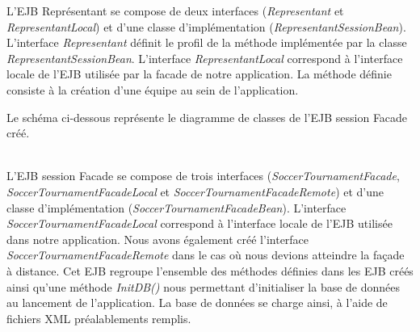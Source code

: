 \documentclass[10pt]{report}
\begin{document}
L'EJB Représentant se compose de deux interfaces (\textit{Representant} et \textit{RepresentantLocal}) et d'une classe d'implémentation (\textit{RepresentantSessionBean}). L'interface \textit{Representant} définit le profil de la méthode implémentée par la classe \textit{RepresentantSessionBean}. L'interface \textit{RepresentantLocal} correspond à l'interface locale de l'EJB utilisée par la facade de notre application. La méthode définie consiste à la création d'une équipe au sein de l'application.

\newpage
Le schéma ci-dessous représente le diagramme de classes de l'EJB session Facade créé. \\
	\begin{figure}[hp]
	      \begin{center}
	      \end{center}
	\end{figure}	
\\

L'EJB session Facade se compose de trois interfaces (\textit{SoccerTournamentFacade}, \textit{SoccerTournamentFacadeLocal} et \textit{SoccerTournamentFacadeRemote}) et d'une classe d'implémentation (\textit{SoccerTournamentFacadeBean}). L'interface \textit{SoccerTournamentFacadeLocal} correspond à l'interface locale de l'EJB utilisée dans notre application. Nous avons également créé l'interface \textit{SoccerTournamentFacadeRemote} dans le cas où nous devions atteindre la façade à distance. Cet EJB regroupe l'ensemble des méthodes définies dans les EJB créés ainsi qu'une méthode \textit{InitDB()} nous permettant d'initialiser la base de données au lancement de l'application. La base de données se charge ainsi, à l'aide de fichiers XML préalablements remplis. 
\end{document}
